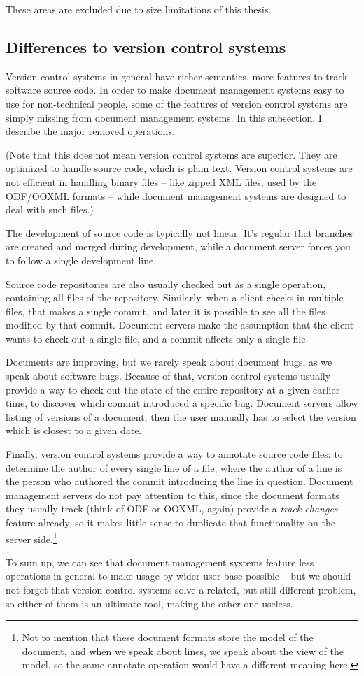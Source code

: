 These areas are excluded due to size limitations of this thesis.

\subsection{Differences to version control systems}

Version control systems in general have richer semantics, more features to
track software source code. In order to make document management systems easy
to use for non-technical people, some of the features of version control
systems are simply missing from document management systems. In this
subsection, I describe the major removed operations.

(Note that this does not mean version control systems are superior. They are
optimized to handle source code, which is plain text. Version control systems
are not efficient in handling binary files -- like zipped XML files, used by
the ODF/OOXML formats -- while document management systems are designed to deal
with such files.)

The development of source code is typically not linear. It's regular that
branches are created and merged during development, while a document server
forces you to follow a single development line.

Source code repositories are also usually checked out as a single operation,
containing all files of the repository. Similarly, when a client checks in
multiple files, that makes a single commit, and later it is possible to see all
the files modified by that commit. Document servers make the assumption that
the client wants to check out a single file, and a commit affects only a single
file.

Documents are improving, but we rarely speak about document bugs, as we speak
about software bugs. Because of that, version control systems usually provide a
way to check out the state of the entire repository at a given earlier
time, to discover which commit introduced a specific bug. Document servers
allow listing of versions of a document, then the user manually has to select
the version which is closest to a given date.

Finally, version control systems provide a way to annotate source code files:
to determine the author of every single line of a file, where the author of a
line is the person who authored the commit introducing the line in question.
Document management servers do not pay attention to this, since the document
formats they usually track (think of ODF or OOXML, again) provide a \emph{track
changes} feature already, so it makes little sense to duplicate that
functionality on the server side.\footnote{Not to mention that these document
formats store the model of the document, and when we speak about lines, we
speak about the view of the model, so the same annotate operation would have a
different meaning here.}

To sum up, we can see that document management systems feature less operations
in general to make usage by wider user base possible -- but we should not
forget that version control systems solve a related, but still different
problem, so either of them is an ultimate tool, making the other one useless.

